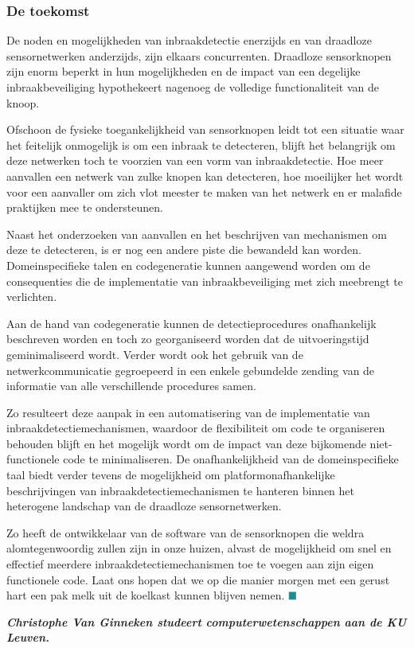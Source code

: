 \documentclass[DIV=calc,paper=a4,fontsize=11pt,twocolumn]{scrartcl}
\newcommand{\heading}[1]{
\vspace{-5mm}
\subsubsection*{#1}
\vspace{-2mm}
}
\begin{document}
\heading{De toekomst}

De noden en mogelijkheden van inbraakdetectie enerzijds en van draadloze
sensornetwerken anderzijds, zijn elkaars concurrenten. Draadloze sensorknopen
zijn enorm beperkt in hun mogelijkheden en de impact van een degelijke
inbraakbeveiliging hypothekeert nagenoeg de volledige functionaliteit van de
knoop.

Ofschoon de fysieke toegankelijkheid van sensorknopen leidt tot een situatie
waar het feitelijk onmogelijk is om een inbraak te detecteren, blijft het
belangrijk om deze netwerken toch te voorzien van een vorm van inbraakdetectie.
Hoe meer aanvallen een netwerk van zulke knopen kan detecteren, hoe moeilijker
het wordt voor een aanvaller om zich vlot meester te maken van het netwerk en
er malafide praktijken mee te ondersteunen.

Naast het onderzoeken van aanvallen en het beschrijven van mechanismen om deze
te detecteren, is er nog een andere piste die bewandeld kan worden.
Domeinspecifieke talen en codegeneratie kunnen aangewend worden om de
consequenties die de implementatie van inbraakbeveiliging met zich meebrengt te
verlichten.

Aan de hand van codegeneratie kunnen de detectieprocedures onafhankelijk
beschreven worden en toch zo georganiseerd worden dat de uitvoeringstijd
geminimaliseerd wordt. Verder wordt ook het gebruik van de netwerkcommunicatie
gegroepeerd in een enkele gebundelde zending van de informatie van alle
verschillende procedures samen.

Zo resulteert deze aanpak in een automatisering van de implementatie van
inbraakdetectiemechanismen, waardoor de flexibiliteit om code te organiseren
behouden blijft en het mogelijk wordt om de impact van deze bijkomende
niet-functionele code te minimaliseren. De onafhankelijkheid van de
domeinspecifieke taal biedt verder tevens de mogelijkheid om
platformonafhankelijke beschrijvingen van inbraakdetectiemechanismen te hanteren
binnen het heterogene landschap van de draadloze sensornetwerken.

Zo heeft de ontwikkelaar van de software van de sensorknopen die weldra
alomtegenwoordig zullen zijn in onze huizen, alvast de mogelijkheid om snel en
effectief meerdere inbraakdetectiemechanismen toe te voegen aan zijn eigen
functionele code. Laat ons hopen dat we op die manier morgen met een gerust
hart een pak melk uit de koelkast kunnen blijven nemen.
$\color{BaseColor}\blacksquare$

\vspace{0.3cm}

\noindent\bf{\emph{Christophe Van Ginneken studeert computerwetenschappen aan de KU
Leuven.}}
\end{document}
